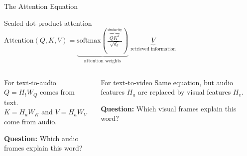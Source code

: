 \documentclass[aspectratio=169,10pt]{beamer}
\newcommand{\term}[1]{\textbf{\textcolor{MidBlue}{#1}}}
\begin{document}
\begin{frame}[t]{The Attention Equation}
\begin{block}{Scaled dot-product attention}
\centering
\Large
$\displaystyle \text{Attention}(Q,K,V)=\underbrace{\text{softmax}\left(\frac{\overbrace{QK^T}^{\text{similarity}}}{\sqrt{d_k}}\right)}_{\text{attention weights}}\;\underbrace{V}_{\text{retrieved information}}$
\end{block}
\vspace{0.25cm}
\begin{columns}[T,onlytextwidth]
\begin{block}{For text-to-audio}
\small
$Q = H_tW_Q$ comes from text.\\
$K = H_aW_K$ and $V = H_aW_V$ come from audio.
\vspace{0.2cm}
\begin{center}
\term{Question:} Which audio frames explain this word?
\end{center}
\end{block}
\begin{block}{For text-to-video}
\small
Same equation, but audio features $H_a$ are replaced by visual features $H_v$.
\vspace{0.2cm}
\begin{center}
\term{Question:} Which visual frames explain this word?
\end{center}
\end{block}
\end{columns}
\end{frame}
\end{document}
